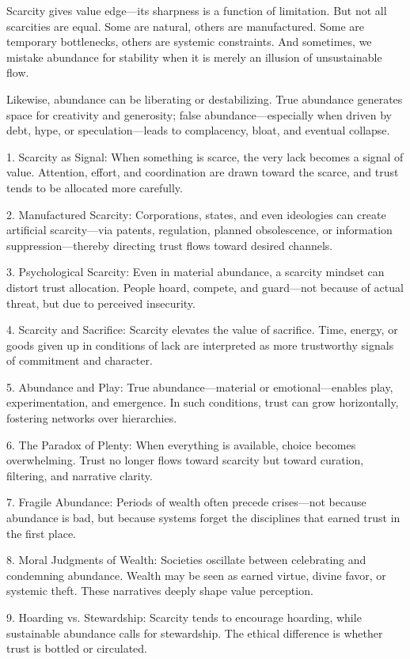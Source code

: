 \documentclass[11pt,oneside]{book}
\begin{document}
Scarcity gives value edge—its sharpness is a function of limitation. But not all scarcities are equal. Some are natural, others are manufactured. Some are temporary bottlenecks, others are systemic constraints. And sometimes, we mistake abundance for stability when it is merely an illusion of unsustainable flow.

Likewise, abundance can be liberating or destabilizing. True abundance generates space for creativity and generosity; false abundance—especially when driven by debt, hype, or speculation—leads to complacency, bloat, and eventual collapse. 

1. Scarcity as Signal:
When something is scarce, the very lack becomes a signal of value. Attention, effort, and coordination are drawn toward the scarce, and trust tends to be allocated more carefully.

2. Manufactured Scarcity:
Corporations, states, and even ideologies can create artificial scarcity—via patents, regulation, planned obsolescence, or information suppression—thereby directing trust flows toward desired channels.

3. Psychological Scarcity:
Even in material abundance, a scarcity mindset can distort trust allocation. People hoard, compete, and guard—not because of actual threat, but due to perceived insecurity.

4. Scarcity and Sacrifice:
Scarcity elevates the value of sacrifice. Time, energy, or goods given up in conditions of lack are interpreted as more trustworthy signals of commitment and character.

5. Abundance and Play:
True abundance—material or emotional—enables play, experimentation, and emergence. In such conditions, trust can grow horizontally, fostering networks over hierarchies.

6. The Paradox of Plenty:
When everything is available, choice becomes overwhelming. Trust no longer flows toward scarcity but toward curation, filtering, and narrative clarity.

7. Fragile Abundance:
Periods of wealth often precede crises—not because abundance is bad, but because systems forget the disciplines that earned trust in the first place.

8. Moral Judgments of Wealth:
Societies oscillate between celebrating and condemning abundance. Wealth may be seen as earned virtue, divine favor, or systemic theft. These narratives deeply shape value perception.

9. Hoarding vs. Stewardship:
Scarcity tends to encourage hoarding, while sustainable abundance calls for stewardship. The ethical difference is whether trust is bottled or circulated.
\end{document}
